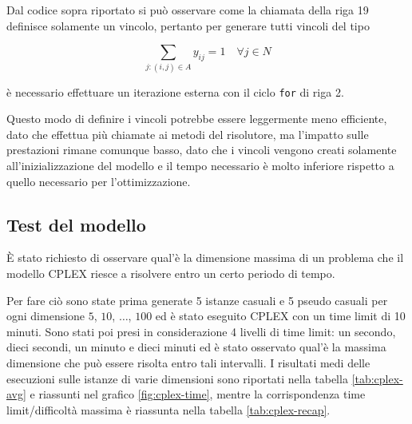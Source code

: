 \noindent Dal codice sopra riportato si può osservare come la chiamata della riga 19 definisce solamente un vincolo, pertanto per generare tutti vincoli del tipo

$$
\sum\limits_{j : (i,j) \in A} y_{ij} = 1 \quad \forall j \in N
$$

\noindent è necessario effettuare un iterazione esterna con il ciclo \texttt{for} di riga 2.

Questo modo di definire i vincoli potrebbe essere leggermente meno efficiente, dato che effettua più chiamate ai metodi del risolutore, ma l'impatto sulle prestazioni rimane comunque basso, dato che i vincoli vengono creati solamente all'inizializzazione del modello e il tempo necessario è molto inferiore rispetto a quello necessario per l'ottimizzazione.

\subsection{Test del modello}

\`E stato richiesto di osservare qual'è la dimensione massima di un problema che il modello CPLEX riesce a risolvere entro un certo periodo di tempo.

Per fare ciò sono state prima generate 5 istanze casuali e 5 pseudo casuali per ogni dimensione $5$, $10$, $\ldots$, $100$ ed è stato eseguito CPLEX con un time limit di 10 minuti. Sono stati poi presi in considerazione 4 livelli di time limit: un secondo, dieci secondi, un minuto e dieci minuti ed è stato osservato qual'è la massima dimensione che può essere risolta entro tali intervalli.
I risultati medi delle esecuzioni sulle istanze di varie dimensioni sono riportati nella tabella \ref{tab:cplex-avg} e riassunti nel grafico \ref{fig:cplex-time}, mentre la corrispondenza time limit/difficoltà massima è riassunta nella tabella \ref{tab:cplex-recap}.

